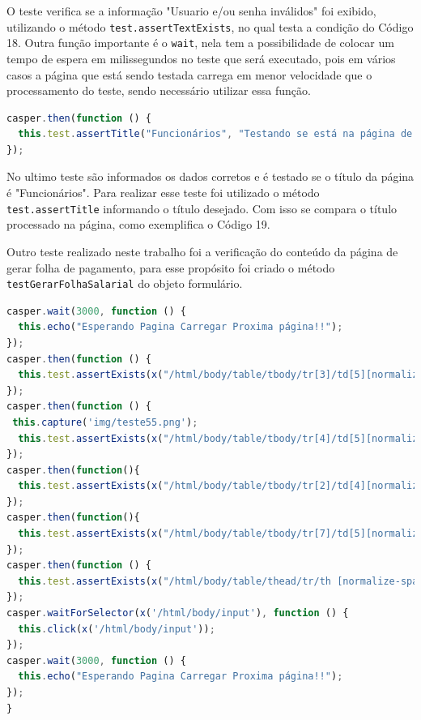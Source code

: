 \par O teste verifica se a informação "Usuario e/ou senha inválidos" foi exibido, utilizando o método \texttt{test.assertTextExists}, no qual testa a condição do Código 18. Outra função importante é o \texttt{wait}, nela tem a possibilidade de colocar um tempo de espera em milissegundos no teste que será executado, pois em vários casos a página que está sendo testada carrega em menor velocidade que o processamento do teste, sendo necessário utilizar essa função.


\begin{lstlisting}[language=JavaScript, caption={[Teste que verifica o título da página.]{Teste que verifica o título da página.  \textbf{Fonte:} Elaborado pelos autores.}}]
casper.then(function () {
  this.test.assertTitle("Funcionários", "Testando se está na página de Funcionários");      
});

\end{lstlisting}

\par No ultimo teste são informados os dados corretos e é testado se o título da página é "Funcionários". Para realizar esse teste foi utilizado o método \texttt{test.assertTitle} informando o título desejado. Com isso se compara o título processado na página, como exemplifica o Código 19.

\par Outro teste realizado neste trabalho foi a verificação do conteúdo da página de gerar folha de pagamento, para esse propósito foi criado o método \texttt{testGerarFolhaSalarial} do objeto formulário.

\newpage


\begin{lstlisting}[language=JavaScript, caption={[Teste que verifica a folha de pagamento.]{Teste que verifica a folha de pagamento.  \textbf{Fonte:} Elaborado pelos autores.}}]
casper.wait(3000, function () {
  this.echo("Esperando Pagina Carregar Proxima página!!");
});
casper.then(function () {
  this.test.assertExists(x("/html/body/table/tbody/tr[3]/td[5][normalize-space()='"+descontoIr+"']"),'Testando o valor de desconto do IR está impresso');
});
casper.then(function () {
 this.capture('img/teste55.png');
  this.test.assertExists(x("/html/body/table/tbody/tr[4]/td[5][normalize-space()='"+descontoInss+"']"),'Testando o valor de desconto do IR está impresso');
});
casper.then(function(){
  this.test.assertExists(x("/html/body/table/tbody/tr[2]/td[4][normalize-space()='"+salario+"']"),'Testando o valor salario está impresso');           
});
casper.then(function(){
  this.test.assertExists(x("/html/body/table/tbody/tr[7]/td[5][normalize-space()='"+salarioLiquido+"']"),'Testando o valor salario Líquido está impresso');           
});
casper.then(function () {
  this.test.assertExists(x("/html/body/table/thead/tr/th [normalize-space()='Nome: "+nome+"']"),'Testando se o nome do funcionário está impresso');
});
casper.waitForSelector(x('/html/body/input'), function () {
  this.click(x('/html/body/input'));
});
casper.wait(3000, function () {
  this.echo("Esperando Pagina Carregar Proxima página!!");
});
}

\end{lstlisting}

